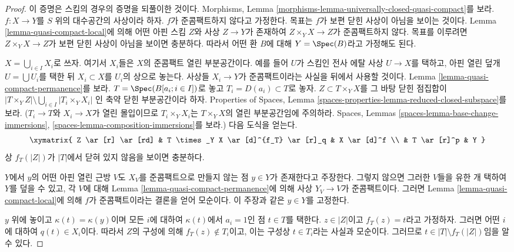 \begin{proof}
이 증명은 스킴의 경우의 증명을 되풀이한 것이다.
Morphisms, Lemma
\ref{morphisms-lemma-universally-closed-quasi-compact}를 보라.
$f : X \to Y$를 $S$ 위의 대수공간의 사상이라 하자.
$f$가 준콤팩트하지 않다고 가정한다.
목표는 $f$가 보편 닫힌 사상이 아님을 보이는 것이다.
Lemma \ref{lemma-quasi-compact-local}에 의해 어떤 아핀 스킴 $Z$와
사상 $Z \to Y$가 존재하여 $Z \times_Y X \to Z$가 준콤팩트하지 않다.
목표를 이루려면 $Z \times_Y X \to Z$가 보편 닫힌 사상이 아님을 보이면
충분하다. 따라서 어떤 환 $B$에 대해 $Y = \Spec(B)$라고 가정해도 된다.

\medskip\noindent
$X = \bigcup_{i \in I} X_i$로 쓰자. 여기서 $X_i$들은 $X$의
준콤팩트 열린 부분공간이다. 예를 들어 $U$가 스킴인 전사 에탈 사상
$U \to X$를 택하고, 아핀 열린 덮개 $U = \bigcup U_i$를 택한 뒤
$X_i \subset X$를 $U_i$의 상으로 놓는다. 사상들 $X_i \to Y$가
준콤팩트이라는 사실을 뒤에서 사용할 것이다.
Lemma \ref{lemma-quasi-compact-permanence}를 보라.
$T = \Spec(B[a_i ; i \in I])$로 놓고 $T_i = D(a_i) \subset T$로 놓자.
$Z \subset T \times_Y X$를 그 바탕 닫힌 점집합이
$|T \times_Y Z| \setminus \bigcup_{i \in I} |T_i \times_Y X_i|$
인 축약 닫힌 부분공간이라 하자. Properties of Spaces, Lemma
\ref{spaces-properties-lemma-reduced-closed-subspace}를 보라.
($T_i \to T$와 $X_i \to X$가 열린 몰입이므로
$T_i \times_Y X_i$는 $T \times_Y X$의 열린 부분공간임에 주의하라.
Spaces, Lemmas \ref{spaces-lemma-base-change-immersions},
\ref{spaces-lemma-composition-immersions}를 보라.)
다음 도식을 얻는다.
$$
\xymatrix{
Z \ar[r] \ar[rd] &
T \times_Y X \ar[d]^{f_T} \ar[r]_q &
X \ar[d]^f \\
& T \ar[r]^p & Y
}
$$
상 $f_T(|Z|)$가 $|T|$에서 닫혀 있지 않음을 보이면 충분하다.

\medskip\noindent
$Y$에서 $y$의 어떤 아핀 열린 근방 $V$도 $X_V$를 준콤팩트으로
만들지 않는 점 $y \in Y$가 존재한다고 주장한다.
그렇지 않으면 그러한 $V$들을 유한 개 택하여 $Y$를 덮을 수 있고,
각 $V$에 대해
Lemma \ref{lemma-quasi-compact-permanence}에 의해 사상
$Y_V \to V$가 준콤팩트이다. 그러면 Lemma
\ref{lemma-quasi-compact-local}에 의해 $f$가 준콤팩트이라는 결론을
얻어 모순이다. 이 주장과 같은 $y \in Y$를 고정한다.

\medskip\noindent
$y$ 위에 놓이고 $\kappa(t) = \kappa(y)$이며 모든 $i$에 대하여
$\kappa(t)$에서 $a_i = 1$인 점 $t \in T$를 택한다.
$z \in |Z|$이고 $f_T(z) = t$라고 가정하자. 그러면 어떤 $i$에 대하여
$q(t) \in X_i$이다. 따라서 $Z$의 구성에 의해
$f_T(z) \not \in T_i$이고, 이는 구성상 $t \in T_i$라는 사실과
모순이다. 그러므로 $t \in |T| \setminus f_T(|Z|)$임을 알 수 있다.


\end{proof}
